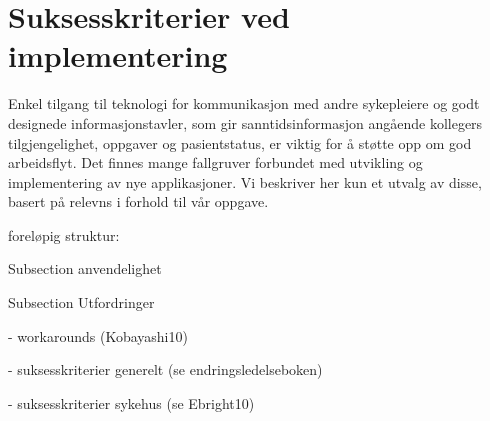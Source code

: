 \section{Suksesskriterier ved implementering}
\label{chp: suksesskriterier}


\noindent
Enkel tilgang til teknologi for kommunikasjon med andre sykepleiere og godt designede informasjonstavler, som gir sanntidsinformasjon angående kollegers tilgjengelighet, oppgaver og pasientstatus, er viktig for å støtte opp om god arbeidsflyt\cite{Ebright10}. Det finnes  mange fallgruver forbundet med utvikling og implementering av nye applikasjoner. Vi beskriver her kun et utvalg av disse, basert på relevns i forhold til vår oppgave.


foreløpig struktur:

Subsection anvendelighet

Subsection Utfordringer


- workarounds (Kobayashi10)

- suksesskriterier generelt (se endringsledelseboken)

- suksesskriterier sykehus (se Ebright10)

\noindent



